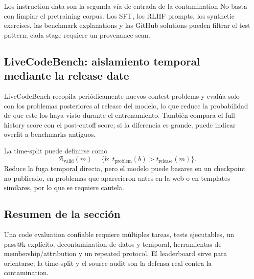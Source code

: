 \begin{warningbox}{Los instruction data son la segunda vía de entrada de la contamination}
No basta con limpiar el pretraining corpus. Los SFT, los RLHF prompts, los synthetic exercises, las benchmark explanations y las GitHub solutions pueden filtrar el test pattern; cada stage requiere un provenance scan.
\end{warningbox}

\subsection{LiveCodeBench: aislamiento temporal mediante la release date}

LiveCodeBench recopila periódicamente nuevos contest problems y evalúa solo con los problemas posteriores al release del modelo, lo que reduce la probabilidad de que este los haya visto durante el entrenamiento. También compara el full-history score con el post-cutoff score; si la diferencia es grande, puede indicar overfit a benchmarks antiguos.


La time-split puede definirse como
\[
\mathcal{B}_{\text{valid}}(m)=\{b:\ t_{\text{problem}}(b)>t_{\text{release}}(m)\}.
\]
Reduce la fuga temporal directa, pero el modelo puede basarse en un checkpoint no publicado, en problemas que aparecieron antes en la web o en templates similares, por lo que se requiere cautela.


\subsection{Resumen de la sección}

Una code evaluation confiable requiere múltiples tareas, tests ejecutables, un pass@k explícito, decontamination de datos y temporal, herramientas de membership/attribution y un repeated protocol. El leaderboard sirve para orientarse; la time-split y el source audit son la defensa real contra la contamination.
